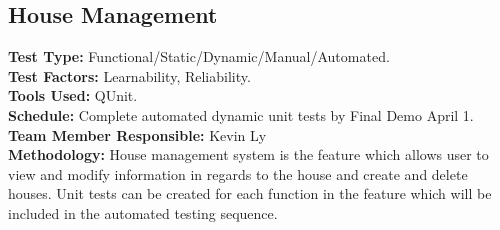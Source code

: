 \documentclass[12pt]{article}
\begin{document}
\subsection{House Management}
\textbf{Test Type:} Functional/Static/Dynamic/Manual/Automated. \\
\textbf{Test Factors:} Learnability, Reliability. \\
\textbf{Tools Used:} QUnit. \\
\textbf{Schedule:} Complete automated dynamic unit tests by Final Demo April 1. \\
\textbf{Team Member Responsible:} Kevin Ly\\
\textbf{Methodology:} House management system is the feature which allows user to view and modify information in regards to the house and create and delete houses. Unit tests can be created for each function in the feature which will be included in the automated testing sequence.
\end{document}

